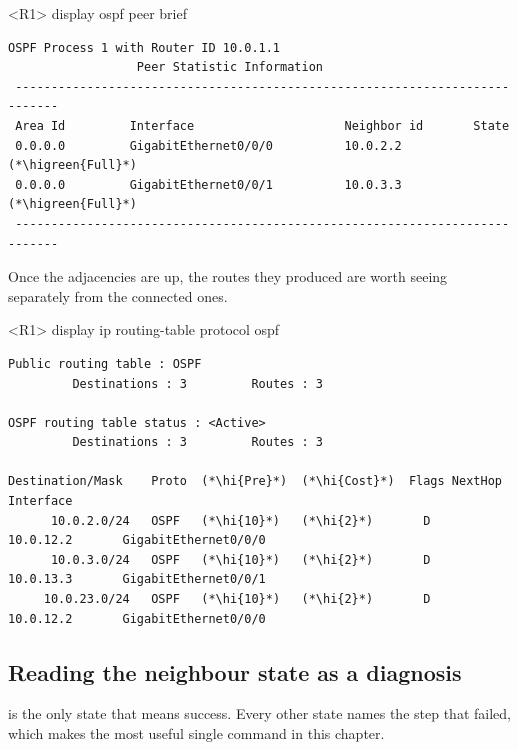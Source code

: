 \begin{vrpbox}{<R1> display ospf peer brief}
\begin{lstlisting}[style=vrp]
         OSPF Process 1 with Router ID 10.0.1.1
                  Peer Statistic Information
 ----------------------------------------------------------------------------
 Area Id         Interface                     Neighbor id       State
 0.0.0.0         GigabitEthernet0/0/0          10.0.2.2          (*\higreen{Full}*)
 0.0.0.0         GigabitEthernet0/0/1          10.0.3.3          (*\higreen{Full}*)
 ----------------------------------------------------------------------------
\end{lstlisting}
\end{vrpbox}

Once the adjacencies are up, the routes they produced are worth seeing
separately from the connected ones.

\begin{vrpbox}{<R1> display ip routing-table protocol ospf}
\begin{lstlisting}[style=vrp]
Public routing table : OSPF
         Destinations : 3         Routes : 3

OSPF routing table status : <Active>
         Destinations : 3         Routes : 3

Destination/Mask    Proto  (*\hi{Pre}*)  (*\hi{Cost}*)  Flags NextHop         Interface
      10.0.2.0/24   OSPF   (*\hi{10}*)   (*\hi{2}*)       D   10.0.12.2       GigabitEthernet0/0/0
      10.0.3.0/24   OSPF   (*\hi{10}*)   (*\hi{2}*)       D   10.0.13.3       GigabitEthernet0/0/1
     10.0.23.0/24   OSPF   (*\hi{10}*)   (*\hi{2}*)       D   10.0.12.2       GigabitEthernet0/0/0
\end{lstlisting}
\end{vrpbox}

\subsection{Reading the neighbour state as a diagnosis}
 is the only state that means success. Every other state names
the step that failed, which makes  the most
useful single command in this chapter.

